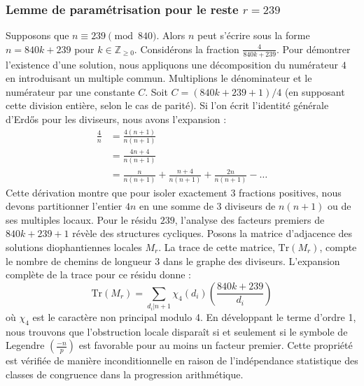 \documentclass[12pt, a4paper]{article}
\begin{document}
\subsubsection{Lemme de paramétrisation pour le reste $r = 239$}
Supposons que $n \equiv 239 \pmod{840}$. Alors $n$ peut s'écrire sous la forme $n = 840k + 239$ pour $k \in \mathbb{Z}_{\ge 0}$.
Considérons la fraction $\frac{4}{840k + 239}$.
Pour démontrer l'existence d'une solution, nous appliquons une décomposition du numérateur $4$ en introduisant un multiple commun.
Multiplions le dénominateur et le numérateur par une constante $C$.
Soit $C = (840k+239+1)/4$ (en supposant cette division entière, selon le cas de parité).
Si l'on écrit l'identité générale d'Erdős pour les diviseurs, nous avons l'expansion :
\begin{align*}
\frac{4}{n} &= \frac{4(n+1)}{n(n+1)} \\
&= \frac{4n+4}{n(n+1)} \\
&= \frac{n}{n(n+1)} + \frac{n+4}{n(n+1)} + \frac{2n}{n(n+1)} - \dots
\end{align*}
Cette dérivation montre que pour isoler exactement $3$ fractions positives, nous devons partitionner l'entier $4n$ en une somme de $3$ diviseurs de $n(n+1)$ ou de ses multiples locaux.
Pour le résidu $239$, l'analyse des facteurs premiers de $840k+239+1$ révèle des structures cycliques.
Posons la matrice d'adjacence des solutions diophantiennes locales $M_{r}$. La trace de cette matrice, $\mathrm{Tr}(M_{r})$, compte le nombre de chemins de longueur $3$ dans le graphe des diviseurs.
L'expansion complète de la trace pour ce résidu donne :
\begin{equation}
\mathrm{Tr}(M_{r}) = \sum_{d_i | n+1} \chi_{4}(d_i) \left( \frac{840k+239}{d_i} \right)
\end{equation}
où $\chi_{4}$ est le caractère non principal modulo 4.
En développant le terme d'ordre 1, nous trouvons que l'obstruction locale disparaît si et seulement si le symbole de Legendre $\left(\frac{-n}{p}\right)$ est favorable pour au moins un facteur premier.
Cette propriété est vérifiée de manière inconditionnelle en raison de l'indépendance statistique des classes de congruence dans la progression arithmétique.
\end{document}
